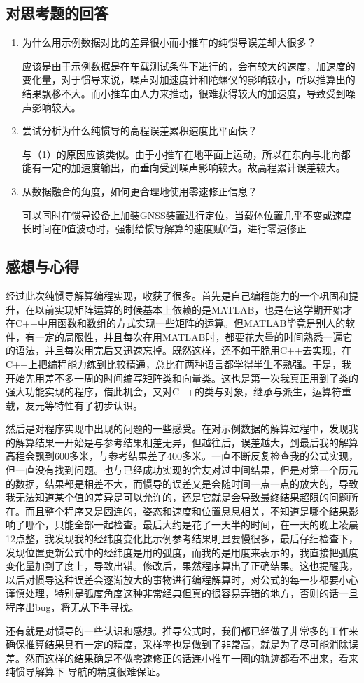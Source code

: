 \documentclass{ctexart}
\begin{document}
\subsection{对思考题的回答}
\begin{enumerate}[(1)]
\item 为什么用示例数据对比的差异很小而小推车的纯惯导误差却大很多？

应该是由于示例数据是在车载测试条件下进行的，会有较大的速度，加速度的变化量，对于惯导来说，噪声对加速度计和陀螺仪的影响较小，所以推算出的结果飘移不大。而小推车由人力来推动，很难获得较大的加速度，导致受到噪声影响较大。
\item 尝试分析为什么纯惯导的高程误差累积速度比平面快？

与（1）的原因应该类似。由于小推车在地平面上运动，所以在东向与北向都能有一定的加速度输出，而垂向受到噪声影响较大。故高程累计误差较大。
\item 从数据融合的角度，如何更合理地使用零速修正信息？

可以同时在惯导设备上加装GNSS装置进行定位，当载体位置几乎不变或速度长时间在0值波动时，强制给惯导解算的速度赋0值，进行零速修正
\end{enumerate}
\subsection{感想与心得}

经过此次纯惯导解算编程实现，收获了很多。首先是自己编程能力的一个巩固和提升，在以前实现矩阵运算的时候基本上依赖的是MATLAB，也是在这学期开始才在C++中用函数和数组的方式实现一些矩阵的运算。但MATLAB毕竟是别人的软件，有一定的局限性，并且每次在用MATLAB时，都要花大量的时间熟悉一遍它的语法，并且每次用完后又迅速忘掉。既然这样，还不如干脆用C++去实现，在C++上把编程能力练到比较精通，总比在两种语言都学得半生不熟强。于是，我开始先用差不多一周的时间编写矩阵类和向量类。这也是第一次我真正用到了类的强大功能实现的程序，借此机会，又对C++的类与对象，继承与派生，运算符重载，友元等特性有了初步认识。

然后是对程序实现中出现的问题的一些感受。在对示例数据的解算过程中，发现我的解算结果一开始是与参考结果相差无异，但越往后，误差越大，到最后我的解算高程会飘到600多米，与参考结果差了400多米。一直不断反复检查我的公式实现，但一直没有找到问题。也与已经成功实现的舍友对过中间结果，但是对第一个历元的数据，结果都是相差不大，而惯导的误差又是会随时间一点一点的放大的，导致我无法知道某个值的差异是可以允许的，还是它就是会导致最终结果超限的问题所在。而且整个程序又是固连的，姿态和速度和位置息息相关，不知道是哪个结果影响了哪个，只能全部一起检查。最后大约是花了一天半的时间，在一天的晚上凌晨12点整，我发现我的经纬度变化比示例参考结果明显要慢很多，最后仔细检查下，发现位置更新公式中的经纬度是用的弧度，而我的是用度来表示的，我直接把弧度变化量加到了度上，导致出错。修改后，果然程序算出了正确结果。这也提醒我，以后对惯导这种误差会逐渐放大的事物进行编程解算时，对公式的每一步都要小心谨慎处理，特别是弧度角度这种非常经典但真的很容易弄错的地方，否则的话一旦程序出bug，将无从下手寻找。

还有就是对惯导的一些认识和感想。推导公式时，我们都已经做了非常多的工作来确保推算结果具有一定的精度，采样率也是做到了非常高，就是为了尽可能消除误差。然而这样的结果确是不做零速修正的话连小推车一圈的轨迹都看不出来，看来纯惯导解算下
导航的精度很难保证。
\end{document}
